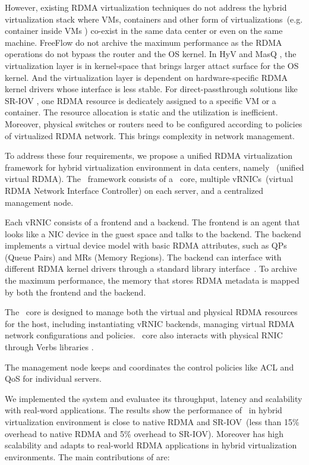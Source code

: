 However, existing RDMA virtualization techniques do not address the hybrid virtualization stack where VMs, containers and other form of virtualizations~(e.g. container inside VMs \cite{containeronvm}) co-exist in the same data center or even on the same machine.
FreeFlow \cite{kim2019freeflow} do not archive the maximum performance as the RDMA operations do not bypass the router and the OS kernel.
In HyV \cite{pfefferle2015hybrid} and MasQ \cite{he2020masq}, the virtualization layer is in kernel-space that brings larger attact surface for the OS kernel. And the virtualization layer is dependent on hardware-specific RDMA kernel drivers whose interface is less stable. 
For direct-passthrough solutions like SR-IOV \cite{sr-iov}, one RDMA resource is dedicately assigned to a specific VM or a container. The resource allocation is static and the utilization is inefficient. Moreover, physical switches or routers need to be configured according to policies of virtualized RDMA network. This brings complexity in network management.

To address these four requirements, we propose a unified RDMA virtualization framework for hybrid virtualization environment in data centers, namely \sys~(unified virtual RDMA). The \sys~framework consists of a \sys~core, multiple vRNICs~(virtual RDMA Network Interface Controller) on each server, and a centralized management node.

Each vRNIC consists of a frontend and a backend. The frontend is an agent that looks like a NIC device in the guest space and talks to the backend. The backend implements a virtual device model with basic RDMA attributes, such as QPs (Queue Pairs) and MRs (Memory Regions). The backend can interface with different RDMA kernel drivers through a standard library interface~\cite{verbs}. To archive the maximum performance, the memory that stores RDMA metadata is mapped by both the frontend and the backend. 

The \sys~core is designed to manage both the virtual and physical RDMA resources for the host, including instantiating vRNIC backends, managing virtual RDMA network configurations and policies. \sys~core also interacts with physical RNIC through Verbs libraries \cite{verbs}.

The management node keeps and coordinates the control policies like ACL and QoS for individual servers.

We implemented the \sys system and evaluatee its throughput, latency and scalability with real-word applications. The results show the performance of \sys~in hybrid virtualization environment is close to native RDMA and SR-IOV~(less than 15\% overhead to native RDMA and 5\% overhead to SR-IOV). Moreover \sys has high scalability and adapts to real-world RDMA applications in hybrid virtualization environments. The main contributions of \sys are:

